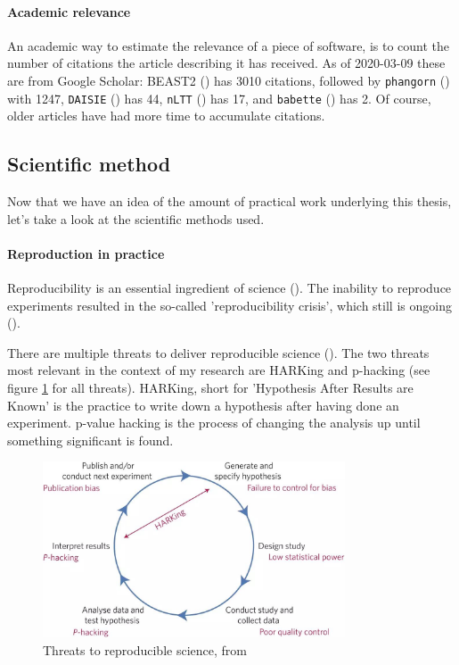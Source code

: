 \paragraph{Academic relevance}

An academic way to estimate the relevance of a piece of software,
is to count the number of citations the article describing it
has received. As of 2020-03-09 these are from Google Scholar:
BEAST2 (\cite{bouckaert2014beast}) has 3010 citations,
followed by \verb;phangorn; (\cite{schliep2011phangorn}) with 1247,
\verb;DAISIE; (\cite{valente2014effects}) has 44, 
\verb;nLTT; (\cite{janzen2015approximate}) has 17,
and \verb;babette; (\cite{bilderbeek2018babette}) has 2. 
Of course, older articles have had more time to accumulate citations.

\subsection{Scientific method}

Now that we have an idea of the amount of practical work underlying
this thesis, let's take a look at the scientific methods used.

\paragraph{Reproduction in practice}

Reproducibility is an essential ingredient of science (\cite{mcnutt2014reproducibility}).
The inability to reproduce experiments resulted in the so-called 'reproducibility
crisis', which still is ongoing (\cite{schooler2014metascience}).

There are multiple threats to deliver reproducible 
science (\cite{munafo2017manifesto}).
The two threats most relevant in the context
of my research are HARKing and p-hacking (see 
figure \ref{fig:manifesto} for all threats).
HARKing, short for 'Hypothesis After Results are Known' is the practice
to write down a hypothesis after having done an experiment.
p-value hacking is the process of changing the analysis up until
something significant is found. 

\begin{figure}[]
  \includegraphics[width=0.8\textwidth]{munafo2017manifesto_fig_1.jpg}
  \caption{
    Threats to reproducible science, from \cite{munafo2017manifesto}
  }
  \label{fig:manifesto}
\end{figure}

